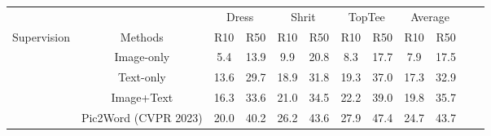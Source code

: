 \documentclass[letterpaper]{article} \usepackage{aaai24}  \usepackage{times}  \usepackage{helvet}  \usepackage{courier}  \usepackage[hyphens]{url}  \usepackage{graphicx} \urlstyle{rm} \def\UrlFont{\rm}  \usepackage{natbib}  \usepackage{caption} \frenchspacing  \setlength{\pdfpagewidth}{8.5in} \setlength{\pdfpageheight}{11in} \usepackage{algorithm}
\begin{document}
\begin{table*}[t]
\centering
\scalebox{1.1}
{\scriptsize
\begin{tabular}{cccccccccccc}
\toprule
                            &                                                          & \multicolumn{2}{c}{Dress}                                                               & \multicolumn{2}{c}{Shrit}                                                      & \multicolumn{2}{c}{TopTee}                                                              & \multicolumn{2}{c}{Average}                               \\ \cmidrule(lr){3-4}\cmidrule(lr){5-6}\cmidrule(lr){7-8}\cmidrule(lr){9-10}
Supervision                 & Methods                                                  & R10                                  & R50                                              & R10                         & R50                                              & R10                                  & R50                                              & R10                         & R50                         \\ \hline
                            & Image-only                                               & 5.4                                  & \multicolumn{1}{c|}{13.9}                        & 9.9                         & \multicolumn{1}{c|}{20.8}                        & 8.3                                  & \multicolumn{1}{c|}{17.7}                        & 7.9                         & 17.5                        \\
                            & Text-only                                                & 13.6                                 & \multicolumn{1}{c|}{29.7}                        & 18.9                        & \multicolumn{1}{c|}{31.8}                        & 19.3                                 & \multicolumn{1}{c|}{37.0}                        & 17.3                        & 32.9                        \\
                            & Image+Text                                               & 16.3                                 & \multicolumn{1}{c|}{33.6}                        & 21.0                        & \multicolumn{1}{c|}{34.5}                        & 22.2                                 & \multicolumn{1}{c|}{39.0}                        & 19.8                        & 35.7                        \\
                            & Pic2Word (CVPR 2023)                                                & 20.0                                 & \multicolumn{1}{c|}{40.2}                        & 26.2                        & \multicolumn{1}{c|}{43.6}                        & 27.9                                 & \multicolumn{1}{c|}{47.4}                        & 24.7                        & 43.7                        \\

\end{tabular}}
\end{table*}
\end{document}
